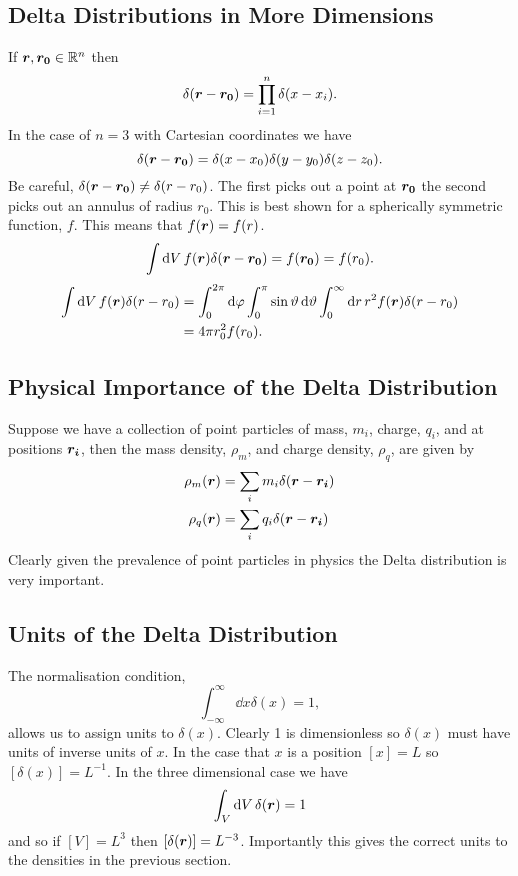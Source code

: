 \documentclass[a4paper]{article}
\begin{document}
    \subsection{Delta Distributions in More Dimensions}
    If \(\bm{r}, \bm{r_0}\in\mathbb{R}^n\) then
    \[\delta(\bm{r} - \bm{r_0}) = \prod_{i=1}^{n}\delta(x - x_i).\]
    In the case of \(n = 3\) with Cartesian coordinates we have
    \[\delta(\bm{r} - \bm{r_0}) = \delta(x - x_0)\delta(y - y_0)\delta(z - z_0).\]
    Be careful, \(\delta(\bm{r} - \bm{r_0})\ne \delta(r - r_0)\).
    The first picks out a point at \(\bm{r_0}\) the second picks out an annulus of radius \(r_0\).
    This is best shown for a spherically symmetric function, \(f\).
    This means that \(f(\bm{r}) = f(r)\).
    \[\int\dd{V}f(\bm{r})\delta(\bm{r} - \bm{r_0}) = f(\bm{r_0}) = f(r_0).\]
    \begin{align*}
        \int\dd{V}f(\bm{r})\delta(r - r_0) &= \int_0^{2\pi}\dd{\varphi}\int_0^{\pi}\sin\vartheta\dd{\vartheta} \int_0^{\infty} \dd{r}r^2f(\bm{r})\delta(r - r_0)\\
        &= 4\pi r_0^2f(r_0).
    \end{align*}

    \subsection{Physical Importance of the Delta Distribution}
    Suppose we have a collection of point particles of mass, \(m_i\), charge, \(q_i\), and at positions \(\bm{r_i}\), then the mass density, \(\rho_m\), and charge density, \(\rho_q\), are given by
    \begin{align*}
        \rho_m(\bm{r}) &= \sum_i m_i\delta(\bm{r} - \bm{r_i})\\
        \rho_q(\bm{r}) &= \sum_i q_i\delta(\bm{r} - \bm{r_i})
    \end{align*}
    Clearly given the prevalence of point particles in physics the Delta distribution is very important.
    
    \subsection{Units of the Delta Distribution}
    The normalisation condition,
    \[\int_{-\infty}^{\infty} \dd{x} \delta(x) = 1,\]
    allows us to assign units to \(\delta(x)\).
    Clearly 1 is dimensionless so \(\delta(x)\) must have units of inverse units of \(x\).
    In the case that \(x\) is a position \([x] = L\) so \([\delta(x)] = L^{-1}\).
    In the three dimensional case we have
    \[\int_V \dd{V}\delta(\bm{r}) = 1\]
    and so if \([V] = L^3\) then \([\delta(\bm{r})] = L^{-3}\).
    Importantly this gives the correct units to the densities in the previous section.
    
\end{document}
